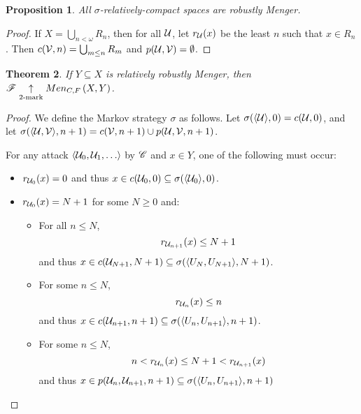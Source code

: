 \documentclass{amsart}
\newtheorem{theorem}{Theorem}[section]
\newtheorem{proposition}[theorem]{Proposition}
\theoremstyle{definition}
\begin{document}
\begin{proposition}
  All \(\sigma\)-relatively-compact spaces are robustly Menger.
\end{proposition}

\begin{proof}
  If \(X=\bigcup_{n<\omega}R_n\), then for all \(\mathcal{U}\), let \(r_{\mathcal{U}}(x)\) be the
  least \(n\) such that \(x\in R_n\). Then \(c(\mathcal{V},n)=\bigcup_{m\leq n}R_m\) and
  \(p(\mathcal{U},\mathcal{V}) = \emptyset\).
\end{proof}

\begin{theorem}
  If \(Y\subseteq X\) is relatively robustly Menger, then
  \(\mathscr{F}\underset{2\text{-mark}}{\uparrow}Men_{C,F}\left({X,Y}\right)\).
\end{theorem}

\begin{proof}
  We define the Markov strategy \(\sigma\) as follows.
  Let \(\sigma(\langle\mathcal{U}\rangle,0)=c(\mathcal{U},0)\), and let
  \(\sigma(\langle\mathcal{U},\mathcal{V}\rangle,n+1)=c(\mathcal{V},n+1)\cup p(\mathcal{U}, \mathcal{V},n+1)\).

  For any attack \(\<\mc{U}_0,\mc{U}_1,\dots\>\) by \(\mathscr{C}\) and \(x\in Y\),
  one of the following must occur:

  \begin{itemize}
    \item
      \(r_{\mathcal{U}_0}(x)=0\) and thus
      \(x\in c(\mathcal{U}_0,0)\subseteq \sigma(\langle\mathcal{U}_0\rangle,0)\).

    \item
      \(r_{\mathcal{U}_0}(x)=N+1\) for some \(N\geq 0\) and:
      \begin{itemize}
        \item
          For all \(n\leq N\),
          \[
            r_{\mathcal{U}_{n+1}}(x)\leq N+1
          \]
          and thus
          \(x\in c(\mathcal{U}_{N+1},N+1) \subseteq
            \sigma(\langle U_N,U_{N+1}\rangle,N+1)\).
        \item
          For some \(n \leq N\),
          \[ r_{\mathcal{U}_n}(x)\leq n \]
          and thus
          \(x\in c(\mathcal{U}_{n+1},n+1) \subseteq
            \sigma(\langle U_n,U_{n+1}\rangle,n+1)\).
        \item
          For some \(n \leq N\),
          \[
            n < r_{\mathcal{U}_n}(x)\leq N+1 < r_{\mathcal{U}_{n+1}}(x)
          \]
         and thus
         \(x\in p(\mathcal{U}_n,\mathcal{U}_{n+1},n+1) \subseteq
          \sigma(\langle U_n,U_{n+1}\rangle,n+1)\)
       \end{itemize}
  \end{itemize}
\end{proof}
\end{document}
